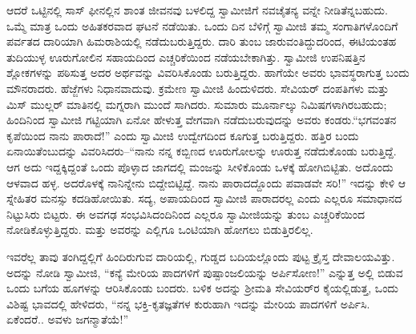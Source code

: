 ಆದರೆ ಒಟ್ಟಿನಲ್ಲಿ ಸಾಸ್ ಫೀನಲ್ಲಿನ ಶಾಂತ ಜೀವನವು ಬಳಲಿದ್ದ ಸ್ವಾಮೀಜಿಗೆ ನವಚೈತನ್ಯ ವನ್ನೇ ನೀಡಿತೆನ್ನಬಹುದು. ಒಮ್ಮೆ ಮಾತ್ರ ಒಂದು ಅಹಿತಕರವಾದ ಘಟನೆ ನಡೆಯಿತು. ಒಂದು ದಿನ ಬೆಳಿಗ್ಗೆ ಸ್ವಾಮೀಜಿ ತಮ್ಮ ಸಂಗಾತಿಗಳೊಂದಿಗೆ ಪರ್ವತದ ದಾರಿಯಾಗಿ ಹಿಮರಾಶಿಯಲ್ಲಿ ನಡೆದುಬರುತ್ತಿದ್ದರು. ದಾರಿ ತುಂಬ ಜಾರುವಂತಿದ್ದುದರಿಂದ, ಈಟಿಯಂತಹ ತುದಿಯುಳ್ಳ ಊರುಗೋಲಿನ ಸಹಾಯದಿಂದ ಎಚ್ಚರಿಕೆಯಿಂದ ನಡೆಯಬೇಕಾಗಿತ್ತು. ಸ್ವಾಮೀಜಿ ಉಪನಿಷತ್ತಿನ ಶ್ಲೋಕಗಳನ್ನು ಪಠಿಸುತ್ತ ಅದರ ಅರ್ಥವನ್ನು ವಿವರಿಸಿಕೊಂಡು ಬರುತ್ತಿದ್ದರು. ಹಾಗೆಯೇ ಅವರು ಭಾವಸ್ಥರಾಗುತ್ತ ಬಂದು ಮೌನರಾದರು. ಹೆಜ್ಜೆಗಳು ನಿಧಾನವಾದುವು. ಕ್ರಮೇಣ ಸ್ವಾಮೀಜಿ ಹಿಂದುಳಿದರು. ಸೇವಿಯರ್ ದಂಪತಿಗಳು ಮತ್ತು ಮಿಸ್ ಮುಲ್ಲರ್ ಮಾತಿನಲ್ಲಿ ಮಗ್ನರಾಗಿ ಮುಂದೆ ಸಾಗಿದರು. ಸುಮಾರು ಮೂರ್ನಾಲ್ಕು ನಿಮಿಷಗಳಾಗಿರಬಹುದು; ಹಿಂದಿನಿಂದ ಸ್ವಾಮೀಜಿ ಗಟ್ಟಿಯಾಗಿ ಏನೋ ಹೇಳುತ್ತ ವೇಗವಾಗಿ ನಡೆದುಬರುವುದನ್ನು ಅವರು ಕಂಡರು.“ಭಗವಂತನ ಕೃಪೆಯಿಂದ ನಾನು ಪಾರಾದೆ!” ಎಂದು ಸ್ವಾಮೀಜಿ ಉದ್ವೇಗದಿಂದ ಕೂಗುತ್ತ ಬರುತ್ತಿದ್ದರು. ಹತ್ತಿರ ಬಂದು ಏನಾಯಿತೆಂಬುದನ್ನು ವಿವರಿಸಿದರು–“ನಾನು ನನ್ನ ಕಬ್ಬಿಣದ ಊರುಗೋಲನ್ನು ಊರುತ್ತ ನಡೆದುಕೊಂಡು ಬರುತ್ತಿದ್ದೆ. ಆಗ ಅದು ಇದ್ದಕ್ಕಿದ್ದಂತೆ ಒಂದು ಪೊಳ್ಳಾದ ಜಾಗದಲ್ಲಿ ಮಂಜನ್ನು ಸೀಳಿಕೊಂಡು ಒಳಕ್ಕೆ ಹೋಗಿಬಿಟ್ಟಿತು. ಅದೊಂದು ಆಳವಾದ ಹಳ್ಳ. ಅದರೊಳಕ್ಕೆ ನಾನಿನ್ನೇನು ಬಿದ್ದೇಬಿಟ್ಟಿದ್ದೆ. ನಾನು ಪಾರಾದದ್ದೊಂದು ಪವಾಡವೇ ಸರಿ!” ಇದನ್ನು ಕೇಳಿ ಆ ಸ್ನೇಹಿತರ ಮನಸ್ಸು ಕದಡಿಹೋಯಿತು. ಸದ್ಯ, ಅಪಾಯದಿಂದ ಸ್ವಾಮೀಜಿ ಪಾರಾದರಲ್ಲ ಎಂದು ಎಲ್ಲರೂ ಸಮಾಧಾನದ ನಿಟ್ಟುಸಿರು ಬಿಟ್ಟರು. ಈ ಅವಗಢ ಸಂಭವಿಸಿದಂದಿನಿಂದ ಎಲ್ಲರೂ ಸ್ವಾಮೀಜಿಯನ್ನು ತುಂಬ ಎಚ್ಚರಿಕೆಯಿಂದ ನೋಡಿಕೊಳ್ಳುತ್ತಿದ್ದರು. ಮತ್ತು ಅವರನ್ನು ಎಲ್ಲಿಗೂ ಒಂಟಿಯಾಗಿ ಹೋಗಲು ಬಿಡುತ್ತಿರಲಿಲ್ಲ.

ಇವರೆಲ್ಲ ತಾವು ತಂಗಿದ್ದಲ್ಲಿಗೆ ಹಿಂದಿರುಗುವ ದಾರಿಯಲ್ಲಿ, ಗುಡ್ಡದ ಬದಿಯಲ್ಲೊಂದು ಪುಟ್ಟ ಕ್ರೈಸ್ತ ದೇವಾಲಯವಿತ್ತು. ಅದನ್ನು ನೋಡಿ ಸ್ವಾಮೀಜಿ, “ಕನ್ಯೆ ಮೇರಿಯ ಪಾದಗಳಿಗೆ ಪುಷ್ಪಾಂಜಲಿಯನ್ನು ಅರ್ಪಿಸೋಣ!” ಎನ್ನುತ್ತ ಅಲ್ಲಿ ಬಿಡುವ ಒಂದು ಬಗೆಯ ಹೂಗಳನ್ನು ಆರಿಸಿಕೊಂಡು ಬಂದರು. ಬಳಿಕ ಅದನ್ನು ಶ್ರೀಮತಿ ಸೇವಿಯರ್​ರ ಕೈಯಲ್ಲಿಡುತ್ತ, ಒಂದು ವಿಶಿಷ್ಟ ಭಾವದಲ್ಲಿ ಹೇಳಿದರು, “ನನ್ನ ಭಕ್ತಿ-ಕೃತಜ್ಞತೆಗಳ ಕುರುಹಾಗಿ ಇದನ್ನು ಮೇರಿಯ ಪಾದಗಳಿಗೆ ಅರ್ಪಿಸಿ. ಏಕೆಂದರೆ.. ಅವಳು ಜಗನ್ಮಾತೆಯೆ!”

